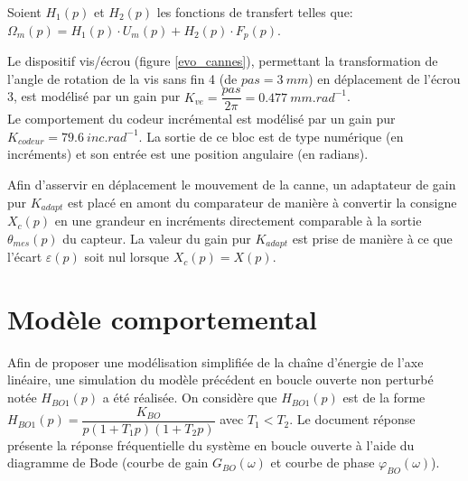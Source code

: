 \medskip
Soient $H_1(p)$ et $H_2(p)$ les fonctions de transfert telles que:  $\Omega_m(p)=H_1(p)\cdot U_m(p) + H_2(p)\cdot F_p(p)$.


\medskip
Le dispositif vis/écrou (figure \ref{evo_cannes}), permettant la transformation de l'angle de rotation de la vis sans fin 4 (de $pas=\SI{3}{mm}$) en déplacement de l'écrou 3, est modélisé par un gain pur $K_{ve}=\dfrac{pas}{2\pi}=\SI{0.477}{mm.rad^{-1}}$.\\
Le comportement du codeur incrémental est modélisé par un gain pur $K_{codeur}=\SI{79.6}{inc.rad^{-1}}$. La sortie de ce bloc est de type numérique (en incréments) et son entrée est une position angulaire (en radians).



Afin d'asservir en déplacement le mouvement de la canne, un adaptateur de gain pur $K_{adapt}$ est placé en amont du comparateur de manière à convertir la consigne $X_c(p)$ en une grandeur en incréments directement comparable à la sortie $\theta_{mes}(p)$ du capteur. La valeur du gain pur $K_{adapt}$ est prise de manière à ce que l'écart $\varepsilon(p)$ soit nul lorsque $X_c(p) = X(p)$.
\medskip




\section{Modèle comportemental}

Afin de proposer une modélisation simplifiée de la chaîne d'énergie de l'axe linéaire, une simulation du modèle précédent en boucle ouverte non perturbé notée $H_{BO1}(p)$ a été réalisée. On considère que $H_{BO1}(p)$ est de la forme $H_{BO1}(p)=\dfrac{K_{BO}}{p(1+T_1p)(1+T_2p)}$ avec $T_1 < T_2$.
Le document réponse présente la réponse fréquentielle du système en boucle ouverte à l'aide du diagramme de Bode (courbe de gain $G_{BO}(\omega)$ et courbe de phase $\varphi_{BO}(\omega)$).
\medskip

